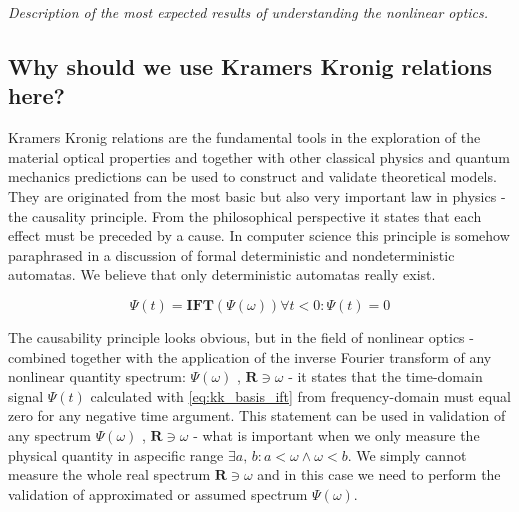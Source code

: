 \documentclass[12pt,twoside,a4paper]{article}
\numberwithin{equation}{subsection}
\numberwithin{figure}{subsection}
\begin{document}
\textit{Description of the most expected results of understanding the nonlinear optics.}

\subsection{Why should we use Kramers Kronig relations here?} \label{chap:introducion_kk}

Kramers Kronig relations are the fundamental tools in the exploration of the material optical properties and together with other classical
physics and quantum mechanics predictions can be used to construct and validate theoretical models. They are originated from the most basic
but also very important law in physics - the causality principle. From the philosophical perspective it states that each effect must be
preceded by a cause. In computer science this principle is somehow paraphrased in a discussion of formal deterministic and
nondeterministic automatas. We believe that only deterministic automatas really exist. 


\begin{subequations}  \label{eq:kk_basis}
 \begin{equation}  \label{eq:kk_basis_ift}
   \Psi (t) = \mathbf{IFT}(\Psi (\omega ))
  \end{equation}
  \begin{equation} \label{eq:kk_basis_casuality}
    \forall t < 0 : \Psi (t) = 0
  \end{equation}
\end{subequations}

The causability principle looks obvious, but in the field of nonlinear optics - combined together with the application of the inverse Fourier
transform of any nonlinear quantity spectrum: $\Psi (\omega )$ , $\textbf{R} \ni \omega$ - it states that the time-domain signal 
$\Psi (t)$ calculated with \ref{eq:kk_basis_ift} from frequency-domain must equal zero for any negative time argument. This statement 
can be used in validation of any spectrum $\Psi (\omega )$ , $\textbf{R} \ni \omega$ - what is important when we only measure the 
physical quantity in aspecific range $\exists a,\,b : a < \omega \wedge \omega < b$. We simply cannot measure the whole real spectrum 
$\textbf{R} \ni \omega $ and in this case we need to perform the validation of approximated or assumed spectrum $\Psi (\omega )$.
\end{document}
